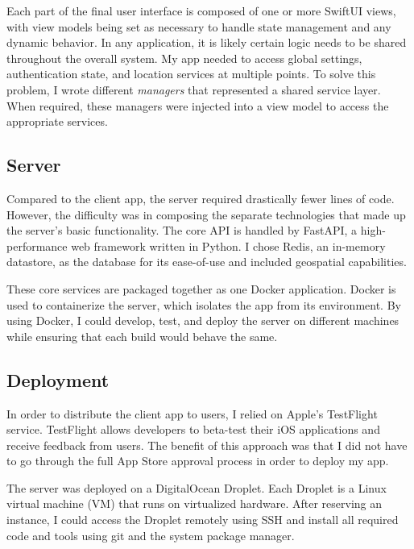 Each part of the final user interface is composed of one or more \textsf{SwiftUI} views, with view models being set as necessary to handle state management and any dynamic behavior. In any application, it is likely certain logic needs to be shared throughout the overall system. My app needed to access global settings, authentication state, and location services at multiple points. To solve this problem, I wrote different \emph{managers} that represented a shared service layer. When required, these managers were injected into a view model to access the appropriate services.

\subsection{Server}

Compared to the client app, the server required drastically fewer lines of code. However, the difficulty was in composing the separate technologies that made up the server's basic functionality. The core API is handled by \textsf{FastAPI}, a high-performance web framework written in Python. I chose Redis, an in-memory datastore, as the database for its ease-of-use and included geospatial capabilities.

These core services are packaged together as one Docker application. Docker is used to containerize the server, which isolates the app from its environment. By using Docker, I could develop, test, and deploy the server on different machines while ensuring that each build would behave the same.

\subsection{Deployment}

In order to distribute the client app to users, I relied on Apple's TestFlight service. TestFlight allows developers to beta-test their iOS applications and receive feedback from users. The benefit of this approach was that I did not have to go through the full App Store approval process in order to deploy my app.

The server was deployed on a DigitalOcean Droplet. Each Droplet is a Linux virtual machine (\textsc{VM}) that runs on virtualized hardware. After reserving an instance, I could access the Droplet remotely using \textsc{SSH} and install all required code and tools using \textsf{git} and the system package manager.
